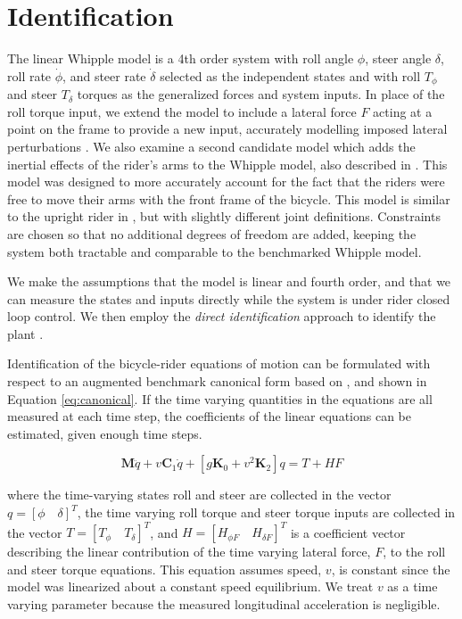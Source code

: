 \documentclass[a4paper]{article}
\begin{document}

\section*{Identification}
\label{sec:identification}

The linear Whipple model is a 4th order system with roll angle $\phi$, steer
angle $\delta$, roll rate $\dot{\phi}$, and steer rate $\dot{\delta}$ selected
as the independent states and with roll $T_\phi$ and steer $T_\delta$ torques
as the generalized forces and system inputs. In place of the roll torque input,
we extend the model to include a lateral force $F$ acting at a point on the
frame to provide a new input, accurately modelling imposed lateral
perturbations \cite{Moore2012}. We also examine a second candidate model which
adds the inertial effects of the rider's arms to the Whipple model, also
described in \cite{Moore2012}. This model was designed to more accurately
account for the fact that the riders were free to move their arms with the
front frame of the bicycle. This model is similar to the upright rider in
\cite{Schwab2012}, but with slightly different joint definitions. Constraints
are chosen so that no additional degrees of freedom are added, keeping the
system both tractable and comparable to the benchmarked Whipple model.

We make the assumptions that the model is linear and fourth order, and that we
can measure the states and inputs directly while the system is under rider
closed loop control. We then employ the \emph{direct identification} approach
to identify the plant \cite{Ljung1999}.

Identification of the bicycle-rider equations of motion can be formulated with
respect to an augmented benchmark canonical form based on \cite{Meijaard2007},
and shown in Equation \ref{eq:canonical}. If the time varying quantities in the
equations are all measured at each time step, the coefficients of the linear
equations can be estimated, given enough time steps.

\begin{equation}
  \mathbf{M} \ddot{q} + v \mathbf{C}_1 \dot{q} + [g \mathbf{K}_0 + v^2
  \mathbf{K}_2] q = T + H F
  \label{eq:canonical}
\end{equation}

where the time-varying states roll and steer are collected in the vector $q =
[\phi \quad \delta]^T$, the time varying  roll torque and steer torque inputs
are collected in the vector $T = [T_\phi \quad T_\delta]^T$, and $H = [H_{\phi
F} \quad H_{\delta F}]^T$ is a coefficient vector describing the linear
contribution of the time varying lateral force, $F$, to the roll and steer
torque equations. This equation assumes  speed, $v$, is constant since the
model was linearized about a constant speed equilibrium. We treat $v$ as a time
varying parameter because the measured longitudinal acceleration is negligible.
\end{document}
